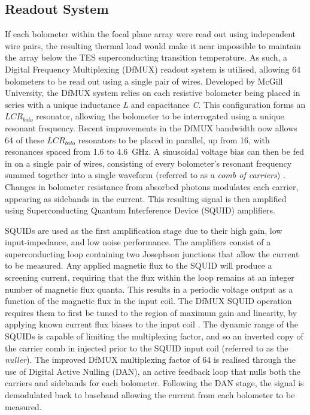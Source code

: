 \documentclass[iop]{emulateapj}
\begin{document}
\subsection{Readout System}

If each bolometer within the focal plane array were read out using independent wire pairs, the resulting thermal load would make it near impossible to maintain the array below the TES superconducting transition temperature.  As such, a Digital Frequency Multiplexing (DfMUX) readout system is utilised, allowing 64 bolometers to be read out using a single pair of wires.  Developed by McGill University, the DfMUX system relies on each resistive bolometer being placed in series with a unique inductance \textit{L} and capacitance \textit{C}.  This configuration forms an $LCR_{bolo}$ resonator, allowing the bolometer to be interrogated using a unique resonant frequency.  Recent improvements in the DfMUX bandwidth now allows 64 of these $LCR_{bolo}$ resonators to be placed in parallel, up from 16, with resonances spaced from 1.6 to 4.6~GHz.  A sinusoidal voltage bias can then be fed in on a single pair of wires, consisting of every bolometer's resonant frequency summed together into a single waveform (referred to as a \textit{comb of carriers}) \citep{bender_digital_2014}.  Changes in bolometer resistance from absorbed photons modulates each carrier, appearing as sidebands in the current.  This resulting signal is then amplified using Superconducting Quantum Interference Device (SQUID) amplifiers.

SQUIDs are used as the first amplification stage due to their high gain, low input-impedance, and low noise performance.  The amplifiers consist of a superconducting loop containing two Josephson junctions that allow the current to be measured.  Any applied magnetic flux to the SQUID will produce a screening current, requiring that the flux within the loop remains at an integer number of magnetic flux quanta.  This results in a periodic voltage output as a function of the magnetic flux in the input coil.  The DfMUX SQUID operation requires them to first be tuned to the region of maximum gain and linearity, by applying known current flux biases to the input coil \citep{bender_digital_2014}.  The dynamic range of the SQUIDs is capable of limiting the multiplexing factor, and so an inverted copy of the carrier comb in injected prior to the SQUID input coil (referred to as the \textit{nuller}).  The improved DfMUX multiplexing factor of 64 is realised through the use of Digital Active Nulling (DAN), an active feedback loop that nulls both the carriers and sidebands for each bolometer.  Following the DAN stage, the signal is demodulated back to baseband allowing the current from each bolometer to be measured.
\end{document}
